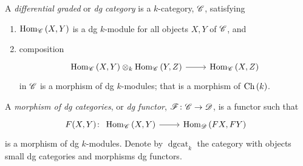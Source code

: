 \documentclass[dissertation.tex]{subfiles}
\begin{document}
\begin{defn}
  A {\it differential graded} or {\it dg category} is a $k$-category, $\mathscr{C}$, satisfying
  \begin{enumerate}
  \item
    $\operatorname{Hom}_{\mathscr{C}}\left(X,Y\right)$ is a dg $k$-module for all objects $X,Y$ of $\mathscr{C}$, and
  \item
    composition 
    $$\begin{tikzcd}
      \Hom{\CC}{X,Y} \otimes_k \Hom{\CC}{Y,Z} \arrow{r} & \Hom{\CC}{X,Z}
    \end{tikzcd}$$
    in $\mathscr{C}$ is a morphism of dg $k$-modules;
    that is a morphism of $\operatorname{Ch}\left(k\right)$.
  \end{enumerate}
  
  A {\it morphism of dg categories}, or {\it dg functor}, $\mathscr{F} \colon \mathscr{C} \rightarrow \mathscr{D}$, is a functor such that
  $$F(X,Y) \colon 
  \begin{tikzcd}
    \Hom{\CC}{X,Y} \arrow{r} & \Hom{\D}{FX,FY}
  \end{tikzcd}$$
  is a morphism of dg $k$-modules.
  Denote by $\operatorname{dgcat}_k$ the category with objects small dg categories and morphisms dg functors.
\end{defn}
\end{document}
